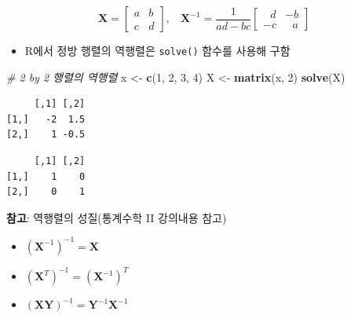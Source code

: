 \documentclass[
  11pt,
]{krantz}
\makeatletter
\newenvironment{Shaded}{\begin{snugshade}}{\end{snugshade}}
\newcommand{\CommentTok}[1]{\textcolor[rgb]{0.37,0.37,0.37}{\textit{#1}}}
\newcommand{\DecValTok}[1]{\textcolor[rgb]{0.06,0.06,0.06}{#1}}
\newcommand{\KeywordTok}[1]{\textcolor[rgb]{0.27,0.27,0.27}{\textbf{#1}}}
\newcommand{\NormalTok}[1]{#1}
\newcommand{\OperatorTok}[1]{\textcolor[rgb]{0.43,0.43,0.43}{\textbf{#1}}}
\newcommand{\StringTok}[1]{\textcolor[rgb]{0.5,0.5,0.5}{#1}}
\providecommand{\tightlist}{%
  \setlength{\itemsep}{0pt}\setlength{\parskip}{0pt}}
\newenvironment{kframe}{%
\medskip{}
\setlength{\fboxsep}{.8em}
 \def\at@end@of@kframe{}%
 \ifinner\ifhmode%
  \def\at@end@of@kframe{\end{minipage}}%
  \begin{minipage}{\columnwidth}%
 \fi\fi%
 \def\FrameCommand##1{\hskip\@totalleftmargin \hskip-\fboxsep
 \colorbox{shadecolor}{##1}\hskip-\fboxsep
     \hskip-\linewidth \hskip-\@totalleftmargin \hskip\columnwidth}%
 \MakeFramed {\advance\hsize-\width
   \@totalleftmargin\z@ \linewidth\hsize
   \@setminipage}}%
 {\par\unskip\endMakeFramed%
 \at@end@of@kframe}
\newenvironment{rmdblock}[1]
  {
  \begin{itemize}
  \renewcommand{\labelitemi}{
    \raisebox{-.7\height}[0pt][0pt]{
      {\setkeys{Gin}{width=3em,keepaspectratio}\texttt{[image: images/\#1]}}
    }
  }
  \setlength{\fboxsep}{1em}
  \begin{kframe}
  \item
  }
  {
  \end{kframe}
  \end{itemize}
  }
\newenvironment{rmdtip}
  {\begin{rmdblock}{tip}}
  {\end{rmdblock}}
\makeatother
\begin{document}
\[\mathrm{\mathbf{X}} = 
 \begin{bmatrix}
 a & b \\
 c & d 
 \end{bmatrix}, ~~~~
 \mathrm{\mathbf{X}}^{-1} = 
 \frac{1}{ad - bc}
 \begin{bmatrix}
~~~d &  -b \\
  -c &~~~a
 \end{bmatrix}
\]

\begin{itemize}
\tightlist
\item
  R에서 정방 행렬의 역행렬은 \texttt{solve()} 함수를 사용해 구함
\end{itemize}

\footnotesize

\begin{Shaded}
\begin{Highlighting}[]
\CommentTok{# 2 by 2 행렬의 역행렬}
\NormalTok{x <-}\StringTok{ }\KeywordTok{c}\NormalTok{(}\DecValTok{1}\NormalTok{, }\DecValTok{2}\NormalTok{, }\DecValTok{3}\NormalTok{, }\DecValTok{4}\NormalTok{)}
\NormalTok{X <-}\StringTok{ }\KeywordTok{matrix}\NormalTok{(x, }\DecValTok{2}\NormalTok{)}
\KeywordTok{solve}\NormalTok{(X)}
\end{Highlighting}
\end{Shaded}

\begin{verbatim}
     [,1] [,2]
[1,]   -2  1.5
[2,]    1 -0.5
\end{verbatim}

\begin{Shaded}
\end{Shaded}

\begin{verbatim}
     [,1] [,2]
[1,]    1    0
[2,]    0    1
\end{verbatim}

\normalsize

\footnotesize

\begin{rmdtip}
\begin{rmdtip}

\textbf{참고}: 역행렬의 성질(통계수학 II 강의내용 참고)

\begin{itemize}
\tightlist
\item
  \((\mathrm{\mathbf{X}}^{-1})^{-1} = \mathrm{\mathbf{X}}\)
\item
  \((\mathrm{\mathbf{X}}^T)^{-1} = (\mathrm{\mathbf{X}}^{-1})^T\)
\item
  \((\mathrm{\mathbf{XY}})^{-1} = \mathrm{\mathbf{Y}}^{-1}\mathrm{\mathbf{X}}^{-1}\)
\end{itemize}

\end{rmdtip}
\end{rmdtip}
\end{document}
